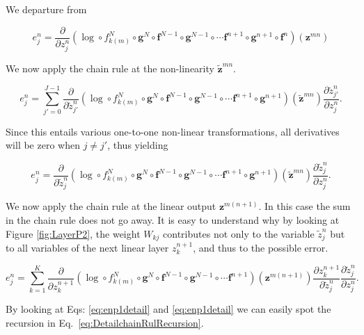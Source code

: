 \noindent We departure from

\begin{equation}
e^{n}_j = \frac{\partial}{\partial z^{n}_{j}} (\log \circ f_{k(m)}^N \circ \mathbf{g}^N \circ \mathbf{f}^{N-1} \circ \mathbf{g}^{N-1} \circ \cdots \mathbf{f}^{n+1} \circ \mathbf{g}^{n+1} \circ \mathbf{f}^{n})(\mathbf{z}^{mn}) 
\end{equation}

\noindent We now apply the chain rule at the non-linearity $\tilde{\mathbf{z}}^{mn}$.

\begin{equation}
e^{n}_j =  \sum_{j'=0}^{J-1}\frac{\partial}{\partial \tilde{z}^{n}_{j'}} (\log \circ f_{k(m)}^N \circ \mathbf{g}^N \circ \mathbf{f}^{N-1} \circ \mathbf{g}^{N-1} \circ \cdots \mathbf{f}^{n+1} \circ \mathbf{g}^{n+1})(\tilde{\mathbf{z}}^{mn})\frac{\partial \tilde{z}^n_{j'}}{\partial z_{j}^n}.
\end{equation}

Since this entails various one-to-one non-linear transformations, all
derivatives will be zero when $j\neq j'$, thus yielding 

\begin{equation}
e^{n}_j =  \frac{\partial}{\partial \tilde{z}^{n}_{j}} (\log \circ f_{k(m)}^N \circ \mathbf{g}^N \circ \mathbf{f}^{N-1} \circ \mathbf{g}^{N-1} \circ \cdots \mathbf{f}^{n+1} \circ \mathbf{g}^{n+1})(\tilde{\mathbf{z}}^{mn})\frac{\partial \tilde{z}^n_{j}}{\partial z_{j}^n}.
\end{equation}

We now apply the chain rule at the linear output $\mathbf{z}^{m(n+1)}$. In this case the sum in the chain rule does not go away. It is easy to
understand why by looking at Figure \ref{fig:LayerP2}, the weight $W_{kj}$
contributes not only to the variable $\tilde{z}^n_j$ but to all variables of the
next linear layer $z^{n+1}_k$, and thus to the possible error. 

\begin{equation}
e^{n}_j = \sum_{k=1}^K \frac{\partial}{\partial z^{n+1}_{k}} (\log \circ f_{k(m)}^N \circ \mathbf{g}^N \circ \mathbf{f}^{N-1} \circ \mathbf{g}^{N-1} \circ \cdots \mathbf{f}^{n+1})(\mathbf{z}^{m(n+1)})\frac{\partial z^{n+1}_k}{\partial \tilde{z}_{j}^n}\frac{\partial \tilde{z}^n_{j}}{\partial z_{j}^n}.
\label{eq:partialfn4}
\end{equation}

\noindent By looking at Eqs: \ref{eq:enp1detail} and \ref{eq:enp1detail} we can easily
spot the recursion in Eq.~\ref{eq:DetailchainRulRecursion}.  


